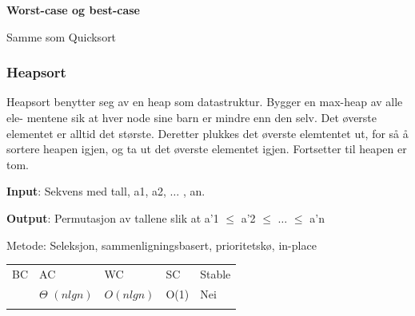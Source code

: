 \documentclass[12pt]{report}
\begin{document}
{\fontsize{14pt}{16.8pt}\selectfont \textbf{Worst-case og best-case}\par}\par

Samme som Quicksort\par




\newpage

\vspace{\baselineskip}\subsubsection*{Heapsort}
\setlength{\parskip}{0.0pt}
Heapsort benytter seg av en heap som datastruktur. Bygger en max-heap av alle ele- mentene sik at hver node sine barn er mindre enn den selv. Det øverste elementet er alltid det største. Deretter plukkes det øverste elemtentet ut, for så å sortere heapen igjen, og ta ut det øverste elementet igjen. Fortsetter til heapen er tom.\par

\textbf{Input}: Sekvens med tall, a1, a2, $ \ldots $ , an.\par

\textbf{Output}: Permutasjon av tallene slik at a’1 $ \leq $  a’2 $ \leq $  $ \ldots $  $ \leq $  a’n\par


\vspace{\baselineskip}
Metode: Seleksjon, sammenligningsbasert, prioritetskø, in-place\par





\begin{table}[H]
 			\centering
\begin{tabular}{p{1.37in}p{1.36in}p{1.34in}p{0.73in}p{0.87in}}
\hline
\multicolumn{1}{p{1.37in}}{{\fontsize{13pt}{15.6pt}\selectfont BC}} & 
\multicolumn{1}{p{1.36in}}{{\fontsize{13pt}{15.6pt}\selectfont AC}} & 
\multicolumn{1}{p{1.34in}}{{\fontsize{13pt}{15.6pt}\selectfont WC}} & 
\multicolumn{1}{p{0.73in}}{{\fontsize{13pt}{15.6pt}\selectfont SC}} & 
\multicolumn{1}{p{0.87in}}{{\fontsize{13pt}{15.6pt}\selectfont Stable}} \\
\hhline{-----}
\multicolumn{1}{p{1.37in}}{{\fontsize{14pt}{16.8pt}\selectfont $ \Omega $  \(  \left( n lgn \right)  \) }} & 
\multicolumn{1}{p{1.36in}}{{\fontsize{14pt}{16.8pt}\selectfont $ \Theta $  \(  \left( n lgn \right)  \) }} & 
\multicolumn{1}{p{1.34in}}{ \( O \left( n lgn \right)  \) } & 
\multicolumn{1}{p{0.73in}}{{\fontsize{14pt}{16.8pt}\selectfont O(1)}} & 
\multicolumn{1}{p{0.87in}}{{\fontsize{13pt}{15.6pt}\selectfont Nei}} \\
\hhline{-----}

\end{tabular}
 \end{table}
\end{document}
